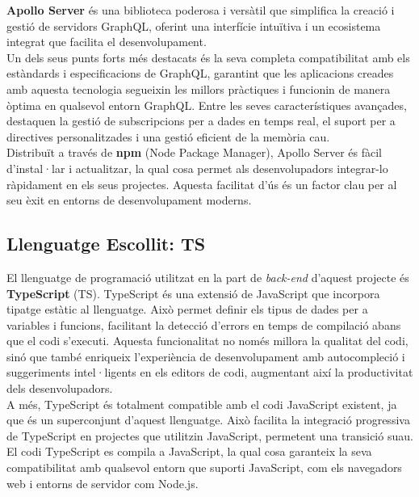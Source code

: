 \documentclass[a4paper,12pt,twoside]{ThesisStyle}
\begin{document}
\textbf{Apollo Server} és una biblioteca poderosa i versàtil que simplifica la creació i gestió de servidors GraphQL, oferint una interfície intuïtiva i un ecosistema integrat que facilita el desenvolupament.\\

Un dels seus punts forts més destacats és la seva completa compatibilitat amb els estàndards i especificacions de GraphQL, garantint que les aplicacions creades amb aquesta tecnologia segueixin les millors pràctiques i funcionin de manera òptima en qualsevol entorn GraphQL. Entre les seves característiques avançades, destaquen la gestió de subscripcions per a dades en temps real, el suport per a directives personalitzades i una gestió eficient de la memòria cau.\\

Distribuït a través de \textbf{npm} (Node Package Manager), Apollo Server és fàcil d'instal·lar i actualitzar, la qual cosa permet als desenvolupadors integrar-lo ràpidament en els seus projectes. Aquesta facilitat d'ús és un factor clau per al seu èxit en entorns de desenvolupament moderns.\\


\subsection{Llenguatge Escollit: TS}
\label{subsec:Llenguatge Escillit: TS}

El llenguatge de programació utilitzat en la part de \textit{back-end} d'aquest projecte és \textbf{TypeScript} (TS). TypeScript és una extensió de JavaScript que incorpora tipatge estàtic al llenguatge. Això permet definir els tipus de dades per a variables i funcions, facilitant la detecció d'errors en temps de compilació abans que el codi s'executi. Aquesta funcionalitat no només millora la qualitat del codi, sinó que també enriqueix l'experiència de desenvolupament amb autocompleció i suggeriments intel·ligents en els editors de codi, augmentant així la productivitat dels desenvolupadors.\\

A més, TypeScript és totalment compatible amb el codi JavaScript existent, ja que és un superconjunt d'aquest llenguatge. Això facilita la integració progressiva de TypeScript en projectes que utilitzin JavaScript, permetent una transició suau. El codi TypeScript es compila a JavaScript, la qual cosa garanteix la seva compatibilitat amb qualsevol entorn que suporti JavaScript, com els navegadors web i entorns de servidor com Node.js.
\end{document}
